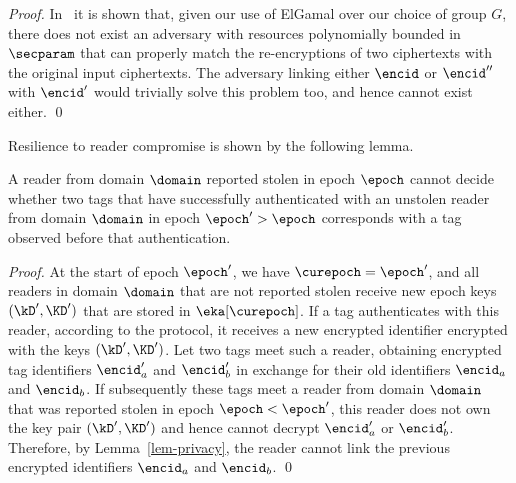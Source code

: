 \begin{proof}
In~\cite{golle2004reencryption} it is shown that, given our use of
ElGamal over our choice of group $G$, there does not exist an adversary with
resources polynomially bounded in $\secparam$ that can properly match the
re-encryptions of two ciphertexts with the original input ciphertexts. 
The adversary linking either $\encid$ or $\encid''$ with $\encid'$ would
trivially solve this problem too, and hence cannot exist either.
\qed
\end{proof}



Resilience to reader compromise is shown by the following lemma.
\begin{lemma}
A reader from domain $\domain$ reported stolen in epoch $\epoch$ cannot decide
whether two tags that have successfully authenticated with an unstolen reader
from domain $\domain$ in epoch $\epoch'> \epoch$ corresponds with a tag
observed before that authentication.
\end{lemma}
\begin{proof}
At the start of epoch $\epoch'$, we have $\curepoch = \epoch'$, and
all readers in domain $\domain$ that are not reported stolen
receive new epoch keys $(\kD',\KD')$ that are stored in $\eka[\curepoch]$. 
If a tag authenticates with this reader, according to the protocol, it receives
a new encrypted identifier encrypted with the keys
$(\kD',\KD')$. Let two tags meet such a reader, obtaining encrypted 
tag identifiers $\encid'_a$ and $\encid'_b$ in exchange for their old
identifiers $\encid_a$ and $\encid_b$.
If subsequently these tags meet a reader from domain $\domain$ that was
reported stolen in epoch $\epoch < \epoch'$, this reader does not own the
key pair $(\kD',\KD')$ and hence cannot decrypt $\encid'_a$ or $\encid'_b$. 
Therefore, by Lemma~\ref{lem-privacy}, the reader cannot link the
previous encrypted identifiers $\encid_a$ and $\encid_b$.
\qed
\end{proof}



